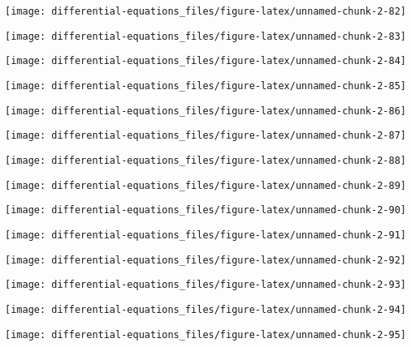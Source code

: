 \documentclass[]{tufte-handout}
\begin{document}
\begin{marginfigure}
\texttt{[image: differential-equations\_files/figure-latex/unnamed-chunk-2-82]} \end{marginfigure}
\begin{marginfigure}
\texttt{[image: differential-equations\_files/figure-latex/unnamed-chunk-2-83]} \end{marginfigure}
\begin{marginfigure}
\texttt{[image: differential-equations\_files/figure-latex/unnamed-chunk-2-84]} \end{marginfigure}
\begin{marginfigure}
\texttt{[image: differential-equations\_files/figure-latex/unnamed-chunk-2-85]} \end{marginfigure}
\begin{marginfigure}
\texttt{[image: differential-equations\_files/figure-latex/unnamed-chunk-2-86]} \end{marginfigure}
\begin{marginfigure}
\texttt{[image: differential-equations\_files/figure-latex/unnamed-chunk-2-87]} \end{marginfigure}
\begin{marginfigure}
\texttt{[image: differential-equations\_files/figure-latex/unnamed-chunk-2-88]} \end{marginfigure}
\begin{marginfigure}
\texttt{[image: differential-equations\_files/figure-latex/unnamed-chunk-2-89]} \end{marginfigure}
\begin{marginfigure}
\texttt{[image: differential-equations\_files/figure-latex/unnamed-chunk-2-90]} \end{marginfigure}
\begin{marginfigure}
\texttt{[image: differential-equations\_files/figure-latex/unnamed-chunk-2-91]} \end{marginfigure}
\begin{marginfigure}
\texttt{[image: differential-equations\_files/figure-latex/unnamed-chunk-2-92]} \end{marginfigure}
\begin{marginfigure}
\texttt{[image: differential-equations\_files/figure-latex/unnamed-chunk-2-93]} \end{marginfigure}
\begin{marginfigure}
\texttt{[image: differential-equations\_files/figure-latex/unnamed-chunk-2-94]} \end{marginfigure}
\begin{marginfigure}
\texttt{[image: differential-equations\_files/figure-latex/unnamed-chunk-2-95]} \end{marginfigure}
\end{document}
